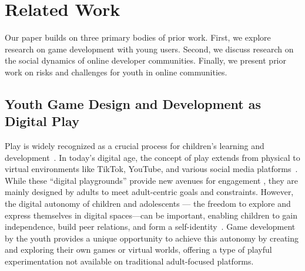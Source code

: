 \section{Related Work}
Our paper builds on three primary bodies of prior work. First, we explore research on game development with young users.  Second, we discuss research on the social dynamics of online developer communities. Finally, we present prior work on risks and challenges for youth  in online communities.


\subsection{Youth Game Design and Development as Digital Play}
Play is widely recognized as a crucial process for children's learning and development~\cite{singer2006roberta}. In today's digital age, the concept of play extends from physical to virtual environments like TikTok, YouTube, and various social media platforms~\cite{10.1145/3173574.3174233}.  While these ``digital playgrounds'' provide new avenues for engagement , they are mainly designed by adults to meet adult-centric goals and constraints. However, the digital autonomy of children and adolescents --- the freedom to explore and express themselves in digital spaces---can be important, enabling children to gain independence, build peer relations, and form a self-identity~\cite{davison2006adolescent, roseth2008promoting, wang202312}. Game development by the youth provides a unique opportunity to achieve this autonomy by creating and exploring their own games or virtual worlds, offering a type of playful experimentation not available on traditional adult-focused platforms.


